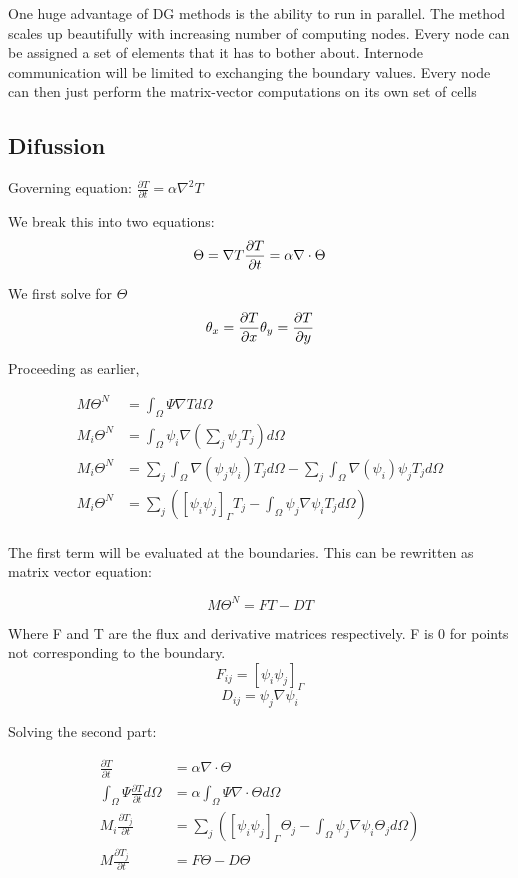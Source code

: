 \documentclass[11pt]{article}
\begin{document}
One huge advantage of DG methods is the ability to run in parallel. The
method scales up beautifully with increasing number of computing nodes.
Every node can be assigned a set of elements that it has to bother
about. Internode communication will be limited to exchanging the
boundary values. Every node can then just perform the matrix-vector
computations on its own set of cells

\subsection{Difussion}\label{difussion}

Governing equation:
\(\frac{\partial T}{\partial t} = \alpha \nabla^2 T\)

We break this into two equations: \[\Theta = \nabla T \\
\frac{\partial T}{\partial t} = \alpha \nabla \cdot \Theta\]

We first solve for \(\Theta\)
\[ \theta_x = \frac{\partial T}{\partial x} \\ \theta_y = \frac{\partial T}{\partial y}\]

Proceeding as earlier,

\begin{align}
 M\Theta^N &= \int_{\Omega}\Psi \nabla T d\Omega \\
 M_i\Theta^N &= \int_{\Omega}\psi_i \nabla  (\sum_j \psi_j T_j) d\Omega \\
 M_i\Theta^N &=  \sum_j \int_{\Omega}\nabla(\psi_j \psi_i) T_j d\Omega - \sum_j \int_{\Omega}\nabla( \psi_i )\psi_j T_j d\Omega\\
 M_i\Theta^N &= \sum_j ([\psi_i \psi_j]_{\Gamma} T_j - \int_{\Omega}\psi_j\nabla\psi_i T_j d\Omega)\\
\end{align}

The first term will be evaluated at the boundaries. This can be
rewritten as matrix vector equation:

\[M\Theta^N = FT - DT\]

Where F and T are the flux and derivative matrices respectively. F is 0
for points not corresponding to the boundary.
\[F_{ij} = [\psi_i \psi_j]_{\Gamma}\] \[D_{ij} = \psi_j\nabla\psi_i\]

Solving the second part:

\begin{align}
\frac{\partial T}{\partial t} &= \alpha \nabla \cdot \Theta\\
\int_\Omega \Psi \frac{\partial T}{\partial t} d\Omega &= \alpha \int_\Omega \Psi \nabla \cdot \Theta d\Omega\\
M_i\frac{\partial T_j}{\partial t} &= \sum_j ([\psi_i \psi_j]_{\Gamma} \Theta_j - \int_{\Omega}\psi_j\nabla\psi_i \Theta_j d\Omega)\\
M\frac{\partial T_j}{\partial t} &= F \Theta - D \Theta \\
\end{align}
\end{document}
